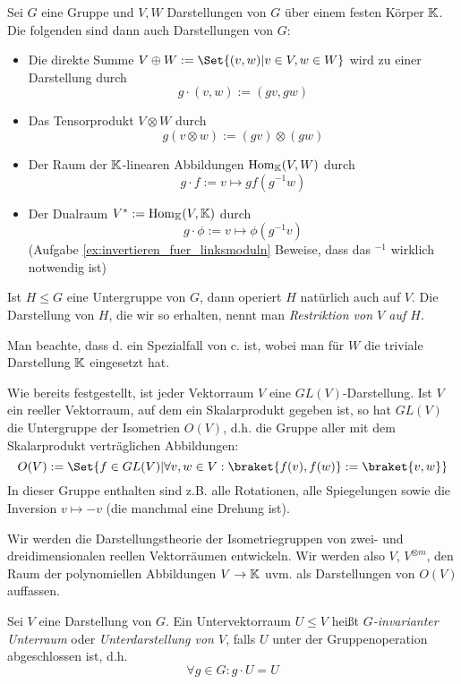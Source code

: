 \begin{lemmadef}
Sei $G$ eine Gruppe und $V,W$ Darstellungen von $G$ über einem festen Körper $\mathbb{K}$. Die folgenden sind dann auch Darstellungen von $G$:
\begin{itemize}
\item Die direkte Summe $V\oplus W := \Set{(v,w) | v\in V, w\in W}$ wird zu einer Darstellung durch
\[g\cdot(v,w) := (gv,gw)\]
\item Das Tensorprodukt $V\otimes W$ durch
\[g(v\otimes w) := (gv)\otimes (gw)\]
\item Der Raum der $\mathbb{K}$-linearen Abbildungen $\operatorname{Hom}_{\mathbb{K}}(V,W)$ durch
\[g\cdot f := v\mapsto gf(g^{-1} w)\]
\item Der Dualraum $V^\ast:= \operatorname{Hom}_{\mathbb{K}}(V,\mathbb{K})$ durch
\[g\cdot \phi := v\mapsto \phi(g^{-1} v)\]
(Aufgabe \ref{ex:invertieren_fuer_linksmoduln} Beweise, dass das $^{-1}$ wirklich notwendig ist)
\end{itemize}
Ist $H\leq G$ eine Untergruppe von $G$, dann operiert $H$ natürlich auch auf $V$. Die Darstellung von $H$, die wir so erhalten, nennt man \emph{Restriktion von $V$ auf $H$}.
\end{lemmadef}

\begin{remark}
Man beachte, dass d. ein Spezialfall von c. ist, wobei man für $W$ die triviale Darstellung $\mathbb{K}$ eingesetzt hat.
\end{remark}

\begin{example}
Wie bereits festgestellt, ist jeder Vektorraum $V$ eine $GL(V)$-Darstellung. Ist $V$ ein reeller Vektorraum, auf dem ein Skalarprodukt gegeben ist, so hat $GL(V)$ die Untergruppe der Isometrien $O(V)$, d.h. die Gruppe aller mit dem Skalarprodukt verträglichen Abbildungen:
\[O(V) := \Set{f\in GL(V) | \forall v,w\in V: \braket{f(v),f(w)} := \braket{v,w}}\]
In dieser Gruppe enthalten sind z.B. alle Rotationen, alle Spiegelungen sowie die Inversion $v\mapsto -v$ (die manchmal eine Drehung ist).

Wir werden die Darstellungstheorie der Isometriegruppen von zwei- und dreidimensionalen reellen Vektorräumen entwickeln. Wir werden also $V$, $V^{\otimes m}$, den Raum der polynomiellen Abbildungen $V\to\mathbb{K}$ uvm. als Darstellungen von $O(V)$ auffassen.
\end{example}

\begin{definition}[Unterdarstellungen]
Sei $V$ eine Darstellung von $G$. Ein Untervektorraum $U\leq V$ heißt \emph{$G$-invarianter Unterraum} oder \emph{Unterdarstellung von $V$}, falls $U$ unter der Gruppenoperation abgeschlossen ist, d.h.
\[\forall g\in G: g\cdot U = U\]
\end{definition}

